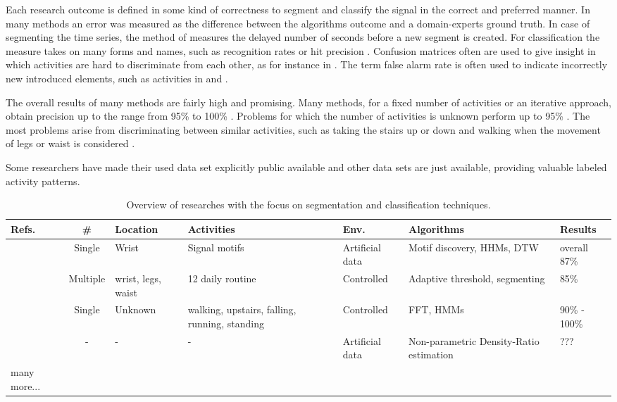 Each research outcome is defined in some kind of correctness to segment and classify the signal in the correct and preferred manner.
In many methods an error was measured as the difference between the algorithms outcome and a domain-experts ground truth.
In case of segmenting the time series, the method of \cite{guenterberg2009automatic} measures the delayed number of seconds before a new segment is created.
For classification the measure takes on many forms and names, such as recognition rates \cite{bao2004activity} or hit precision \cite{ahmed2012non}.
Confusion matrices often are used to give insight in which activities are hard to discriminate from each other, as for instance in \cite{kwapisz2011activity}.
The term false alarm rate is often used to indicate incorrectly new introduced elements, such as activities in \cite{ahmed2012non} and \cite{kawahara2009change}.

The overall results of many methods are fairly high and promising.
Many methods, for a fixed number of activities or an iterative approach, obtain precision up to the range from 95\% to 100\% \cite{minnen2006discovering, shi2009towards, kwapisz2011activity, duque2012offline, he2009activity, lee2178physical, siirtola2012recognizing}.
Problems for which the number of activities is unknown perform up to 95\% \cite{ahmed2012non, barbivc2004segmenting}.
The most problems arise from discriminating between similar activities, such as taking the stairs up or down and walking when the movement of legs or waist is considered \cite{kwapisz2011activity, duque2012offline}.

Some researchers have made their used data set explicitly public available and other data sets are just available, providing valuable labeled activity patterns. 

\begin{table}
\tiny
\centering
\begin{tabular}{ | l | c | p{1.5cm} | p{1.5cm} | p{1.5cm} | p{2.5cm} | p{3cm} | }
  \hline
  Refs. & \# & Location & Activities & Env. & Algorithms & Results \\
  \hline
  \cite{minnen2006discovering} & Single & Wrist & Signal motifs & Artificial data & Motif discovery, HHMs, DTW & overall 87\% \\
  \hline
  \cite{guenterberg2009automatic} & Multiple & wrist, legs, waist & 12 daily routine & Controlled & Adaptive threshold, segmenting & 85\% \\
  \hline
  \cite{shi2009towards} & Single & Unknown & walking, upstairs, falling, running, standing & Controlled & FFT, HMMs & 90\% - 100\% \\
  \hline
  \cite{kawahara2009change} & - & - & - & Artificial data & Non-parametric Density-Ratio estimation & ??? \\
  \hline
  many more... & & & & & & \\
  \hline
\end{tabular}
\caption{Overview of researches with the focus on segmentation and classification techniques.}
\label{table:papers_segmentation_classification}
\end{table}